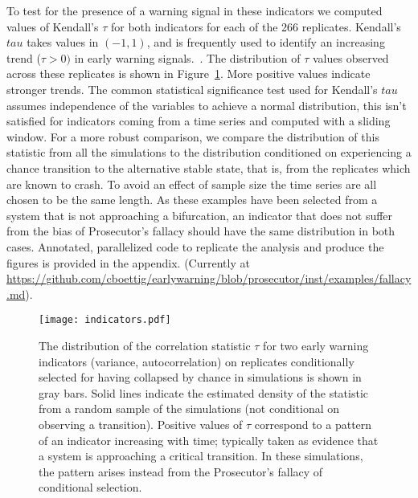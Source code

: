 \documentclass[authoryear,review,12pt]{elsarticle}
\begin{document}
To test for the presence of a warning signal in these indicators we
computed values of Kendall's $\tau$ for both indicators for each of
the 266 replicates.  Kendall's $tau$ takes values in $(-1, 1)$, and is
frequently used to identify an increasing trend ($\tau > 0 )$ in early
warning signals.~\citep{Dakos2008, Dakos2011}.  The distribution
of $\tau$ values observed across these replicates is shown in
Figure~\ref{fig:indicator}.  More positive values indicate stronger
trends. The common statistical significance test used for Kendall's $tau$
assumes independence of the variables to achieve a normal distribution,
this isn't satisfied for indicators coming from a time series and
computed with a sliding window.  For a more robust comparison, we
compare the distribution of this statistic from all the simulations to
the distribution conditioned on experiencing a chance transition to the
alternative stable state, that is, from the replicates which are known
to crash.  To avoid an effect of sample size the time series are all chosen
to be the same length.  As these examples have been selected from a system
that is not approaching a bifurcation, an indicator that does not suffer
from the bias of Prosecutor's fallacy should have the same distribution
in both cases.   Annotated, parallelized code to replicate the analysis
and produce the figures is provided in the appendix.  (Currently at
\href{https://github.com/cboettig/earlywarning/blob/prosecutor/inst/examples/fallacy.md}{https://github.com/cboettig/earlywarning/blob/prosecutor/inst/examples/fallacy.md}).


\begin{figure}
  \begin{center}
    \texttt{[image: indicators.pdf]}
  \end{center}
  \caption{The distribution of the correlation statistic $\tau$ for two
  early warning indicators (variance, autocorrelation) on replicates
  conditionally selected for having collapsed by chance in simulations
  is shown in gray bars.  Solid lines indicate the estimated density of
  the statistic from a random sample of the simulations (not conditional
  on observing a transition). Positive values of $\tau$ correspond to
  a pattern of an indicator increasing with time; typically taken as
  evidence that a system is approaching a critical transition.  In these
  simulations, the pattern arises instead from the Prosecutor's fallacy
  of conditional selection.}
  \label{fig:indicator}
\end{figure}
\end{document}
